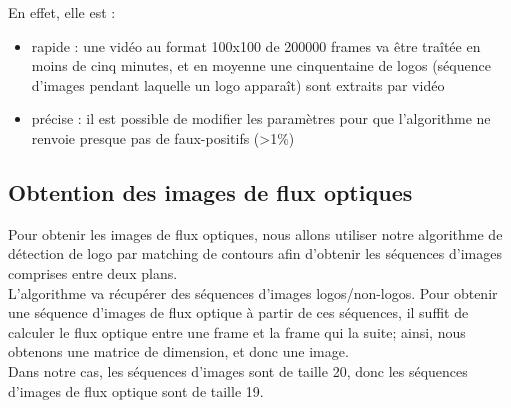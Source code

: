 \documentclass[11pt]{article}
\begin{document}
En effet, elle est :\\
\begin{itemize}
\item rapide : une vidéo au format 100x100 de 200000 frames va être traîtée en moins de cinq minutes, et en moyenne une cinquentaine de logos (séquence d'images pendant laquelle un logo apparaît) sont extraits par vidéo\\
\item précise : il est possible de modifier les paramètres pour que l'algorithme ne renvoie presque pas de faux-positifs (>1\%)\\
\end{itemize}

\subsection{Obtention des images de flux optiques}
\label{sec:org3e1ef37}
Pour obtenir les images de flux optiques, nous allons utiliser notre algorithme de détection de logo par matching de contours afin d'obtenir les séquences d'images comprises entre deux plans.\\
L'algorithme va récupérer des séquences d'images logos/non-logos. Pour obtenir une séquence d'images de flux optique à partir de ces séquences, il suffit de calculer le flux optique entre une frame et la frame qui la suite; ainsi, nous obtenons une matrice de dimension, et donc une image.\\
Dans notre cas, les séquences d'images sont de taille 20, donc les séquences d'images de flux optique sont de taille 19.\\
\end{document}
